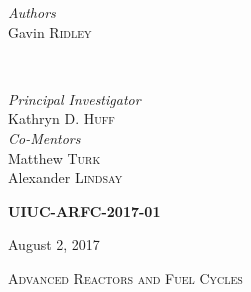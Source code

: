 \begin{titlepage}
    
    \begin{minipage}{0.4\textwidth}
        \begin{flushleft}
            \large
            \textit{Authors}\\
            Gavin \textsc{Ridley}\\
        \end{flushleft}
    \end{minipage}
    ~
    \begin{minipage}{0.4\textwidth}
        \begin{flushright}
            \large
            \textit{Principal Investigator}\\
            Kathryn D. \textsc{Huff}\\%
            \textit{Co-Mentors}\\
            Matthew \textsc{Turk}\\
            Alexander \textsc{Lindsay}
        \end{flushright}
    \end{minipage}
    

    \vspace{1cm}
    \textsc{\LARGE\bfseries UIUC-ARFC-2017-01} %
    \vspace{0.5cm}
    
    
    \vspace{0.5cm} %
    {\large August 2, 2017} %
    \vspace{0.5cm}

    
    \textsc{\LARGE Advanced Reactors and Fuel Cycles}\\[0.25cm] %
    

\end{titlepage}
